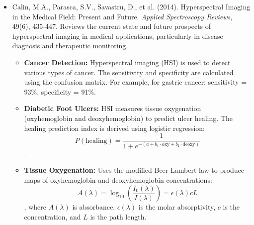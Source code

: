 \documentclass[10pt,svgnames,fragile]{beamer}
\begin{document}
\begin{frame}{}
\tiny
\begin{itemize}
    
    \item Calin, M.A., Parasca, S.V., Savastru, D., et al. (2014). Hyperspectral Imaging in the Medical Field: Present and Future. \textit{Applied Spectroscopy Reviews}, 49(6), 435-447. \href{https://www.tandfonline.com/doi/abs/10.1080/05704928.2014.881309}{\color{blue}{DOI: 10.1080/05704928.2014.881309}}
    {\color{gray}Reviews the current state and future prospects of hyperspectral imaging in medical applications, particularly in disease diagnosis and therapeutic monitoring.}
    \begin{itemize} \tiny
    \item \textbf{Cancer Detection:} Hyperspectral imaging (HSI) is used to detect various types of cancer. The sensitivity and specificity are calculated using the confusion matrix. For example, for gastric cancer: sensitivity = 93\%, specificity = 91\%.
    \item \textbf{Diabetic Foot Ulcers:} HSI measures tissue oxygenation (oxyhemoglobin and deoxyhemoglobin) to predict ulcer healing. The healing prediction index is derived using logistic regression: \[ P(\text{healing}) = \frac{1}{1 + e^{-(a + b_1 \cdot \text{oxy} + b_2 \cdot \text{deoxy})}} \].
    \item \textbf{Tissue Oxygenation:} Uses the modified Beer-Lambert law to produce maps of oxyhemoglobin and deoxyhemoglobin concentrations: \[ A(\lambda) = \log_{10}\left(\frac{I_0(\lambda)}{I(\lambda)}\right) = \epsilon(\lambda) c L \], where \( A(\lambda) \) is absorbance, \( \epsilon(\lambda) \) is the molar absorptivity, \( c \) is the concentration, and \( L \) is the path length.
\end{itemize}

\end{itemize}
\end{frame}
\end{document}
